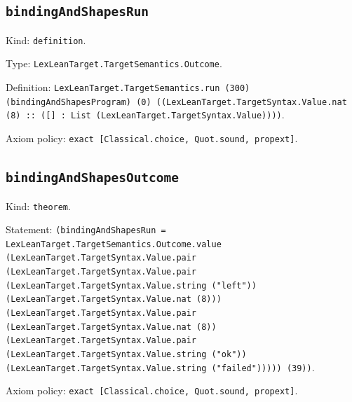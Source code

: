 \documentclass[11pt]{article}
\begin{document}
\subsection*{\texttt{bindingAndShapesRun}}
\noindent Kind: \texttt{definition}.\par
\noindent Type: \texttt{LexLeanTarget.TargetSemantics.Outcome}.\par
\noindent Definition: \texttt{LexLeanTarget.TargetSemantics.run (300) (bindingAndShapesProgram) (0) ((LexLeanTarget.TargetSyntax.Value.nat (8) :: ([] : List (LexLeanTarget.TargetSyntax.Value))))}.\par
\noindent Axiom policy: \texttt{exact [Classical.choice, Quot.sound, propext]}.\par
\subsection*{\texttt{bindingAndShapesOutcome}}
\noindent Kind: \texttt{theorem}.\par
\noindent Statement: \texttt{(bindingAndShapesRun = LexLeanTarget.TargetSemantics.Outcome.value (LexLeanTarget.TargetSyntax.Value.pair (LexLeanTarget.TargetSyntax.Value.pair (LexLeanTarget.TargetSyntax.Value.string ("left")) (LexLeanTarget.TargetSyntax.Value.nat (8))) (LexLeanTarget.TargetSyntax.Value.pair (LexLeanTarget.TargetSyntax.Value.nat (8)) (LexLeanTarget.TargetSyntax.Value.pair (LexLeanTarget.TargetSyntax.Value.string ("ok")) (LexLeanTarget.TargetSyntax.Value.string ("failed"))))) (39))}.\par
\noindent Axiom policy: \texttt{exact [Classical.choice, Quot.sound, propext]}.\par
\end{document}
